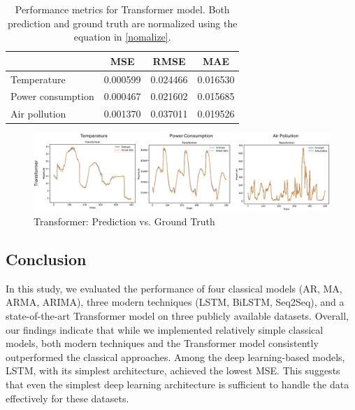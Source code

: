 \documentclass{scrartcl}
\begin{document}
\begin{table}[h!]
\centering
\begin{tabular}{@{}lccc@{}}
\toprule
\textbf{}               & \textbf{MSE} & \textbf{RMSE} & \textbf{MAE} \\ \midrule
Temperature             & 0.000599     & 0.024466      & 0.016530     \\
Power consumption       & 0.000467     & 0.021602      & 0.015685     \\
Air pollution           & 0.001370     & 0.037011      & 0.019526     \\ \bottomrule
\end{tabular}
\caption{Performance metrics for Transformer model. Both prediction and ground truth are normalized using the equation in \ref{nomalize}.}
\label{tab:trans_metric}
\end{table}


\begin{figure}[H]
	\begin{center}
		\includegraphics[scale=0.8]{Latex_report/fig/trans.pdf}
	\end{center}
	\caption{Transformer: Prediction vs. Ground Truth}
	\label{fig:trans}
\end{figure}




\subsection{Conclusion}
In this study, we evaluated the performance of four classical models (AR, MA, ARMA, ARIMA), three modern techniques (LSTM, BiLSTM, Seq2Seq), and a state-of-the-art Transformer model on three publicly available datasets. Overall, our findings indicate that while we implemented relatively simple classical models, both modern techniques and the Transformer model consistently outperformed the classical approaches. Among the deep learning-based models, LSTM, with its simplest architecture, achieved the lowest MSE. This suggests that even the simplest deep learning architecture is sufficient to handle the data effectively for these datasets.
\end{document}
